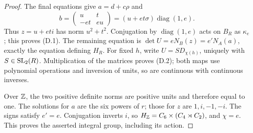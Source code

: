 \begin{proof}
The final equations give \(a=d+c\rho\) and
\[
 b=\begin{pmatrix}u&t\\-et&eu\end{pmatrix}
   =(u+et\sigma)\operatorname{diag}(1,e).
\]
Thus \(z=u+eti\) has norm \(u^2+t^2\).
Conjugation by \(\operatorname{diag}(1,e)\) acts on \(B_R\)
as \(\kappa_e\); this proves (D.1).
The remaining equation is
\(\det U=eN_B(z)=e'N_A(a)\), exactly the equation defining \(H_R\).
For fixed \(h\), write \(U=SD_{\chi(h)}\), uniquely with
\(S\in\operatorname{SL}_2(R)\).  Multiplication of the matrices proves (D.2);
both maps use polynomial operations and inversion of units, so are
continuous with continuous inverses.

Over \(\mathbb Z\), the two positive definite norms are positive units and
therefore equal to one.  The solutions for \(a\) are the six powers
of \(r\); those for \(z\) are \(1,i,-1,-i\).
The signs satisfy \(e'=e\).  Conjugation inverts \(i\), so
\(H_\mathbb Z=C_6\times(C_4\rtimes C_2)\), and \(\chi=e\).
This proves the asserted integral group, including its action.
\end{proof}

